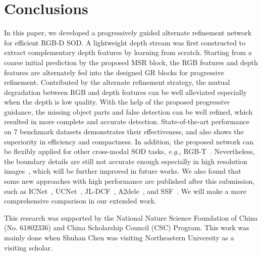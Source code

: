 \documentclass[runningheads]{llncs}
\begin{document}
\section{Conclusions}
In this paper, we developed a progressively guided alternate refinement network for efficient RGB-D SOD. A lightweight depth stream was first constructed to extract complementary depth features by learning from scratch. Starting from a coarse initial prediction by the proposed MSR block, the RGB features and depth features are alternately fed into the designed GR blocks for progressive refinement. Contributed by the alternate refinement strategy, the mutual degradation between RGB and depth features can be well alleviated especially when the depth is low quality. With the help of the proposed progressive guidance, the missing object parts and false detection can be well refined, which resulted in more complete and accurate detection. State-of-the-art performance on 7 benchmark datasets demonstrates their effectiveness, and also shows the superiority in efficiency and compactness. In addition, the proposed network can be flexibly applied for other cross-modal SOD tasks, \textit{e.g.}, RGB-T~\cite{tang2019rgbt}. Nevertheless, the boundary details are still not accurate enough especially in high resolution images~\cite{zeng2019towards}, which will be further improved in future works. We also found that some new approaches with high performance are published after this submission, such as ICNet~\cite{li2020icnet}, UCNet~\cite{zhang2020uc}, JL-DCF~\cite{fu2020jl}, A2dele~\cite{piao2020a2dele}, and SSF~\cite{zhang2020select}. We will make a more comprehensive comparison in our extended work.

 This research was supported by the National Nature Science Foundation of China (No. 61802336) and China Scholarship Council (CSC) Program. This work was mainly done when Shuhan Chen was visiting Northeastern University as a visiting scholar.

\clearpage


\end{document}
